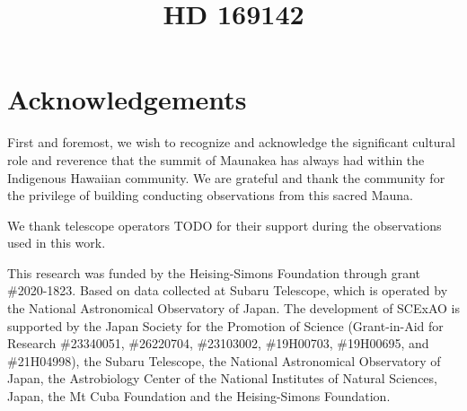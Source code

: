 \documentclass[twocolumn]{aastex631}
\begin{document}
\title{HD 169142}



\begin{abstract}
\end{abstract}




\section*{Acknowledgements}
First and foremost, we wish to recognize and acknowledge the significant cultural role and reverence that the summit of Maunakea has always had within the Indigenous Hawaiian community. We are grateful and thank the community for the privilege of building conducting observations from this sacred Mauna.

We thank telescope operators TODO for their support during the observations used in this work.

This research was funded by the Heising-Simons Foundation through grant \#2020-1823. Based on data collected at Subaru Telescope, which is operated by the National Astronomical Observatory of Japan. The development of SCExAO is supported by the Japan Society for the Promotion of Science (Grant-in-Aid for Research \#23340051, \#26220704, \#23103002, \#19H00703, \#19H00695, and \#21H04998), the Subaru Telescope, the National Astronomical Observatory of Japan, the Astrobiology Center of the National Institutes of Natural Sciences, Japan, the Mt Cuba Foundation and the Heising-Simons Foundation.


\end{document}
